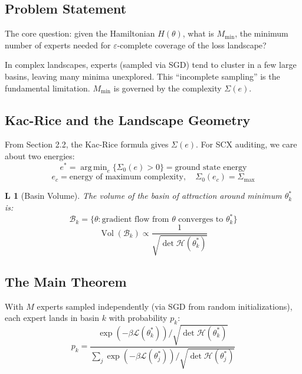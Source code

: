 \documentclass[12pt,a4paper]{article}
\newtheorem{lemma}[theorem]Lemma
\newcommand{\loss}{\mathcal{L}}
\DeclareMathOperator*{\argmin}{arg\,min}
\begin{document}
\subsection{Problem Statement}
The core question: given the Hamiltonian \(H(\theta)\), what is \(M_{\min}\), the minimum number of experts needed for \(\varepsilon\)-complete coverage of the loss landscape?

In complex landscapes, experts (sampled via SGD) tend to cluster in a few large basins, leaving many minima unexplored. This ``incomplete sampling'' is the fundamental limitation. \(M_{\min}\) is governed by the complexity \(\Sigma(e)\).

\subsection{Kac-Rice and the Landscape Geometry}
From Section 2.2, the Kac-Rice formula gives \(\Sigma(e)\). For SCX auditing, we care about two energies:
\begin{equation}
e^* = \argmin_e \{ \Sigma_0(e) > 0 \} = \text{ground state energy}
\end{equation}
\begin{equation}
e_c = \text{energy of maximum complexity}, \quad \Sigma_0(e_c) = \Sigma_{\max}
\end{equation}

\begin{lemma}[Basin Volume]\label{lemma:golf}
The volume of the basin of attraction around minimum \(\theta_k^*\) is:
\begin{equation}
\mathcal{B}_k = \{\theta : \text{gradient flow from } \theta \text{ converges to } \theta_k^*\}
\end{equation}
\begin{equation}
\operatorname{Vol}(\mathcal{B}_k) \propto \frac{1}{\sqrt{\det \mathcal{H}(\theta_k^*)}}
\end{equation}
\end{lemma}

\subsection{The Main Theorem}
With \(M\) experts sampled independently (via SGD from random initializations), each expert lands in basin \(k\) with probability \(p_k\):
\begin{equation}\label{eq:basin_prob}
p_k = \frac{\exp(-\beta \loss(\theta_k^*)) / \sqrt{\det \mathcal{H}(\theta_k^*)}}{\sum_j \exp(-\beta \loss(\theta_j^*)) / \sqrt{\det \mathcal{H}(\theta_j^*)}}
\end{equation}
\end{document}
